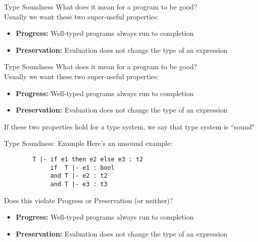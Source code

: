 \documentclass{beamer}
\begin{document}
    \begin{frame}{Type Soundness}
        What does it mean for a program to be good? \\
        
        Usually we want these two super-useful properties:
        \begin{itemize}
            \item \textbf{Progress:} Well-typed programs always run to completion
            \item \textbf{Preservation:} Evaluation does not change the type of an expression
        \end{itemize}
    \end{frame}
    
    \begin{frame}{Type Soundness}
        What does it mean for a program to be good? \\
        
        Usually we want these two super-useful properties:
        \begin{itemize}
            \item \textbf{Progress:} Well-typed programs always run to completion
            \item \textbf{Preservation:} Evaluation does not change the type of an expression
        \end{itemize} \pause
        
        If these two properties hold for a type system, we say that type system is ``sound"
    \end{frame}
    
    \begin{frame}[fragile]{Type Soundness: Example}
        Here's an unsound example: 
        \begin{verbatim}
        T |- if e1 then e2 else e3 : t2
             if  T |- e1 : bool
             and T |- e2 : t2
             and T |- e3 : t3
        \end{verbatim}
        Does this violate Progress or Preservation (or neither)?
        
        
        \begin{itemize}
            \item \textbf{Progress:} Well-typed programs always run to completion
            \item \textbf{Preservation:} Evaluation does not change the type of an expression
        \end{itemize}
    \end{frame}
\end{document}
